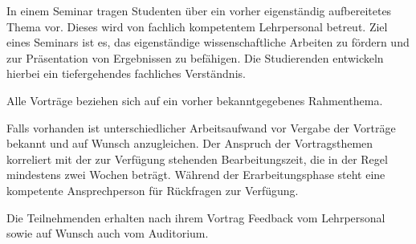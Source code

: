In einem Seminar tragen Studenten über ein vorher eigenständig aufbereitetes Thema vor. Dieses wird von fachlich kompetentem Lehrpersonal betreut. Ziel eines Seminars ist es, das eigenständige wissenschaftliche Arbeiten zu fördern und zur Präsentation von Ergebnissen zu befähigen. Die Studierenden entwickeln hierbei ein tiefergehendes fachliches Verständnis.

Alle Vorträge beziehen sich auf ein vorher bekanntgegebenes Rahmenthema.

Falls vorhanden ist unterschiedlicher Arbeitsaufwand vor Vergabe der Vorträge bekannt und auf Wunsch anzugleichen. Der Anspruch der Vortragsthemen korreliert mit der zur Verfügung stehenden Bearbeitungszeit, die in der Regel mindestens zwei Wochen beträgt. Während der Erarbeitungsphase steht eine kompetente Ansprechperson für Rückfragen zur Verfügung.

Die Teilnehmenden erhalten nach ihrem Vortrag Feedback vom Lehrpersonal sowie auf Wunsch auch vom Auditorium.
